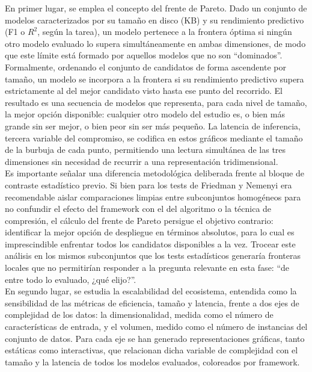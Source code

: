 \documentclass[a4paper,12pt,twoside,final]{book}
\begin{document}
En primer lugar, se emplea el concepto del frente de Pareto. Dado un conjunto de modelos caracterizados por su tamaño
en disco (KB) y su rendimiento predictivo (F1 o $R^2$, según la tarea), un modelo pertenece a la frontera óptima si
ningún otro modelo evaluado lo supera simultáneamente en ambas dimensiones, de modo que este límite está formado por
aquellos modelos que no son ``dominados''. Formalmente, ordenando el conjunto de candidatos de forma ascendente por
tamaño, un modelo se incorpora a la frontera si su rendimiento predictivo supera estrictamente al del mejor candidato
visto hasta ese punto del recorrido. El resultado es una secuencia de modelos que representa, para cada nivel de tamaño,
la mejor opción disponible: cualquier otro modelo del estudio es, o bien más grande sin ser mejor, o bien peor sin ser
más pequeño. La latencia de inferencia, tercera variable del compromiso, se codifica en estos gráficos mediante el
tamaño de la burbuja de cada punto, permitiendo una lectura simultánea de las tres dimensiones sin necesidad de
recurrir a una representación tridimensional.\\

Es importante señalar una diferencia metodológica deliberada frente al bloque de contraste estadístico previo. Si bien
para los tests de Friedman y Nemenyi era recomendable aislar comparaciones limpias entre subconjuntos homogéneos para no
confundir el efecto del framework con el del algoritmo o la técnica de compresión, el cálculo del frente de Pareto
persigue el objetivo contrario: identificar la mejor opción de despliegue en términos absolutos, para lo cual es
imprescindible enfrentar todos los candidatos disponibles a la vez. Trocear este análisis en los mismos subconjuntos que
los tests estadísticos generaría fronteras locales que no permitirían responder a la pregunta relevante en esta fase:
``de entre todo lo evaluado, ¿qué elijo?''.\\

En segundo lugar, se estudia la escalabilidad del ecosistema, entendida como la sensibilidad de las métricas de
eficiencia, tamaño y latencia, frente a dos ejes de complejidad de los datos: la dimensionalidad, medida como el número
de características de entrada, y el volumen, medido como el número de instancias del conjunto de datos. Para cada eje
se han generado representaciones gráficas, tanto estáticas como interactivas, que relacionan dicha variable de
complejidad con el tamaño y la latencia de todos los modelos evaluados, coloreados por framework.
\end{document}
